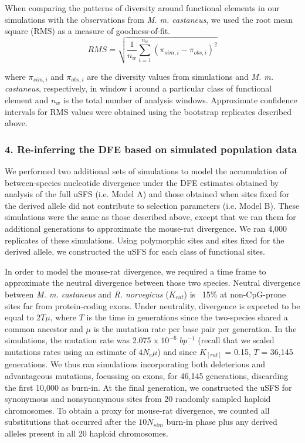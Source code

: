 When comparing the patterns of diversity around functional elements in our simulations with the observations from \textit{M. m. castaneus}, we used the root mean square (RMS) as a measure of goodness-of-fit. 
\begin{equation}
RMS = \sqrt{  \frac{1}{n_w}  \sum_{i=1}^{n_w} (\pi_{sim,i} - \pi_{obs,i})^2  }
\end{equation}

where $\pi_{sim,i}$ and $\pi_{obs,i}$ are the diversity values from simulations and \textit{M. m. castaneus}, respectively, in window i around a particular class of functional element and $n_w$ is the total number of analysis windows. Approximate confidence intervals for RMS values were obtained using the bootstrap replicates described above.

\subsubsection{4. Re-inferring the DFE based on simulated population data}

	We performed two additional sets of simulations to model the accumulation of between-species nucleotide divergence under the DFE estimates obtained by analysis of the full uSFS (i.e. Model A) and those obtained when sites fixed for the derived allele did not contribute to selection parameters (i.e. Model B). These simulations were the same as those described above, except that we ran them for additional generations to approximate the mouse-rat divergence. We ran 4,000 replicates of these simulations. Using polymorphic sites and sites fixed for the derived allele, we constructed the uSFS for each class of functional sites. 

	In order to model the mouse-rat divergence, we required a time frame to approximate the neutral divergence between those two species. Neutral divergence between \textit{M. m. castaneus} and \textit{R. norvegicus} ($K_{rat}$) is ~15\% at non-CpG-prone sites far from protein-coding exons. Under neutrality, divergence is expected to be equal to $2T\mu$, where $T$ is the time in generations since the two-species shared a common ancestor and $\mu$ is the mutation rate per base pair per generation. In the simulations, the mutation rate was 2.075 x $10^{-6}$ $bp^{-1}$ (recall that we scaled mutations rates using an estimate of $4N_e\mu$) and since $K_[rat]$ = 0.15, $T$ = 36,145 generations. We thus ran simulations incorporating both deleterious and advantageous mutations, focussing on exons, for 46,145 generations, discarding the first 10,000 as burn-in. At the final generation, we constructed the uSFS for synonymous and nonsynonymous sites from 20 randomly sampled haploid chromosomes. To obtain a proxy for mouse-rat divergence, we counted all substitutions that occurred after the $10N_{sim}$ burn-in phase plus any derived alleles present in all 20 haploid chromosomes.

